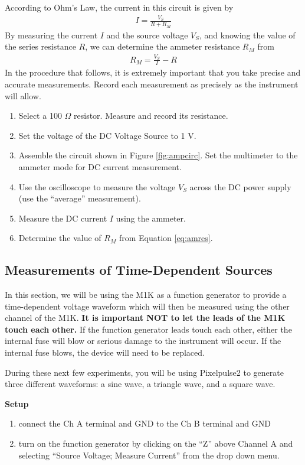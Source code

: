 \documentclass[12pt]{../manual}
\begin{document}
According to Ohm's Law, the current in this circuit is given by
\begin{align}
I = \frac{V_S}{R + R_M}
\end{align}
By measuring the current $I$ and the source voltage $V_S$, and knowing the value of the series resistance $R$, we can determine the ammeter resistance $R_M$ from
\begin{align}
R_M = \frac{V_S}{I} - R \label{eq:amres}
\end{align}
In the procedure that follows, it is extremely important that you take precise and accurate measurements. Record each measurement as precisely as the instrument will allow.
\begin{enumerate}
\item Select a 100 $\Omega$ resistor. Measure and record its resistance. 
\item Set the voltage of the DC Voltage Source to 1 V.
\item Assemble the circuit shown in Figure \ref{fig:ampcirc}. Set the multimeter to the ammeter mode for DC current measurement.
\item Use the oscilloscope to measure the voltage $V_S$ across the DC power supply (use the ``average'' measurement).
\item Measure the DC current $I$ using the ammeter. 
\item Determine the value of $R_M$ from Equation \eqref{eq:amres}. 
\end{enumerate}

\newpage
\subsection{Measurements of Time-Dependent Sources}
In this section, we will be using the M1K as a function generator to provide a time-dependent voltage waveform which will then be measured using the other channel of the M1K. \textbf{It is important NOT to let the leads of the M1K touch each other.} If the function generator leads touch each other, either the internal fuse will blow or serious damage to the instrument will occur. If the internal fuse blows, the device will need to be replaced.

During these next few experiments, you will be using Pixelpulse2 to generate three different waveforms: a sine wave, a triangle wave, and a square wave. 

{\bf Setup}
\begin{enumerate}
\item connect the Ch A terminal and GND to the Ch B terminal and GND
\item turn on the function generator by clicking on the ``Z'' above Channel A and selecting ``Source Voltage; Measure Current'' from the drop down menu.
\end{enumerate}
\end{document}
